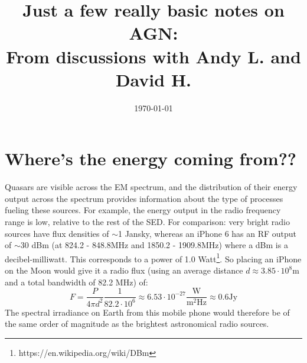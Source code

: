 \documentclass[11pt]{article}
\begin{document}
\title{Just a few really basic notes on AGN: \\
From discussions with Andy L. and David H.}
\date{\today}
\maketitle





\section{Where's the energy coming from??}
Quasars are visible across the EM spectrum, and the distribution of their energy output across the spectrum provides information about the type of processes fueling these sources. For example, the energy output in the radio frequency range is low, relative to the rest of the SED. For comparison: very bright radio sources have flux densities of $\sim$1 Jansky, whereas an iPhone 6 has an RF output of $\sim$30 dBm (at 824.2 - 848.8MHz and 1850.2 - 1909.8MHz) where a dBm is a decibel-milliwatt. This corresponds to a power of 1.0 Watt\footnote{https://en.wikipedia.org/wiki/DBm}. So placing an iPhone on the Moon would give it a radio flux (using an average distance $d \approx 3.85 \cdot 10^8$m and a total bandwidth of 82.2 MHz)  of:
$$
F = \frac{P}{4\pi d^2}\frac{1}{82.2\cdot 10^6} \approx 6.53 \cdot 10^{-27}\frac{\mathrm{W}}{\mathrm{m}^{2}\mathrm{Hz}} \approx 0.6 \mathrm{Jy}
$$
The spectral irradiance on Earth from this mobile phone would therefore be of the same order of magnitude as the brightest astronomical radio sources.\\
\end{document}
